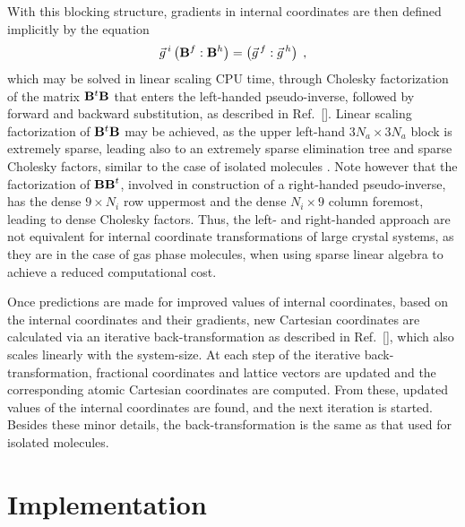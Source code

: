 \twolinestyle{\documentclass[prb,preprint]{revtex4}}
\begin{document}
With this blocking structure, gradients in internal coordinates are then defined implicitly by the equation
\begin{equation}
\vec{g}^{\, i} \left( {\bf B}^f : {\bf B}^h \right)= \left(\vec{g}^{\, f} : \vec{g}^{\, h} \right) \;, 
\end{equation}
which  may be solved in linear scaling CPU time, through Cholesky factorization of the 
matrix ${\bf B}^{t} {\bf B}$ that enters the left-handed pseudo-inverse, 
followed by forward and backward substitution, as described in Ref.~[].  
Linear scaling factorization of ${\bf B}^t \bf B$ may be achieved, as the upper left-hand 
$3 N_a \times 3 N_a$ block is extremely sparse, leading also to  an extremely sparse elimination tree
and sparse Cholesky factors, similar to the case of isolated molecules \cite{KNemeth00B}.
Note however that the factorization of ${\bf B B}^{t}$, involved in construction of a right-handed 
pseudo-inverse, has the dense $9 \times N_i$ row uppermost and the dense $N_i \times 9$ column foremost,
leading to dense Cholesky factors. Thus, the left- and right-handed approach  are not equivalent for 
internal coordinate transformations of large crystal systems, as they are in the case of
gas phase molecules, when using sparse linear algebra to achieve a reduced computational cost.

Once predictions are made for improved values of internal coordinates,
based on the internal coordinates and their gradients, new Cartesian coordinates are 
calculated via an iterative back-transformation as described in Ref.~[], 
which also scales linearly with the system-size. At each step of the iterative back-transformation, 
fractional coordinates 
and lattice vectors are updated and the corresponding atomic Cartesian coordinates are
computed.  From these, updated values of the internal coordinates are found, and
the next iteration is started.  Besides these minor details, the back-transformation
is the same as that used for isolated molecules.

\section{Implementation} \label{implementation}
\end{document}
